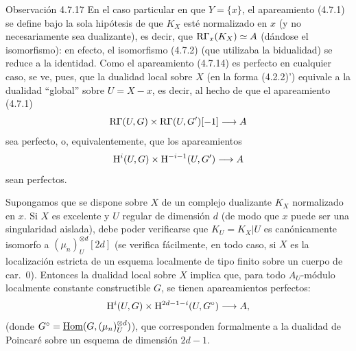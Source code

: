 \begin{statement}{Observación 4.7.17}
En el caso particular en que $Y=\{x\}$, el apareamiento (4.7.1) se define bajo la sola hipótesis de que $K_X$ esté normalizado en $x$ (y no necesariamente sea dualizante), es decir, que $\mathrm{R}\Gamma_x(K_X)\simeq A$ (dándose el isomorfismo): en efecto, el isomorfismo (4.7.2) (que utilizaba la bidualidad) se reduce a la identidad. Como el apareamiento (4.7.14) es perfecto en cualquier caso, se ve, pues, que la dualidad local sobre $X$ (en la forma (4.2.2)') equivale a la dualidad \textquotedblleft global\textquotedblright{} sobre $U=X-x$, es decir, al hecho de que el apareamiento (4.7.1)
\[
\mathrm{R}\Gamma(U,G)\times\mathrm{R}\Gamma(U,G')[-1]\longrightarrow A
\]
sea perfecto, o, equivalentemente, que los apareamientos
\[
\mathrm{H}^i(U,G)\times\mathrm{H}^{-i-1}(U,G')\longrightarrow A
\]
sean perfectos.

Supongamos que se dispone sobre $X$ de un complejo dualizante $K_X$ normalizado en $x$. Si $X$ es excelente y $U$ regular de dimensión $d$ (de modo que $x$ puede ser una singularidad aislada), debe poder verificarse que $K_U=K_X|U$ es canónicamente isomorfo a $(\mu_n)_U^{\otimes d}[2d]$ (se verifica fácilmente, en todo caso, si $X$ es la localización estricta de un esquema localmente de tipo finito sobre un cuerpo de car.~0). Entonces la dualidad local sobre $X$ implica que, para todo $A_U$-módulo localmente constante constructible $G$, se tienen apareamientos perfectos:
\[
\mathrm{H}^i(U,G)\times\mathrm{H}^{2d-1-i}(U,G^\circ)\longrightarrow A,
\]
(donde $G^\circ=\underline{\operatorname{Hom}}(G,(\mu_n)_U^{\otimes d})$), que corresponden formalmente a la dualidad de Poincaré sobre un esquema de dimensión $2d-1$.
\end{statement}
